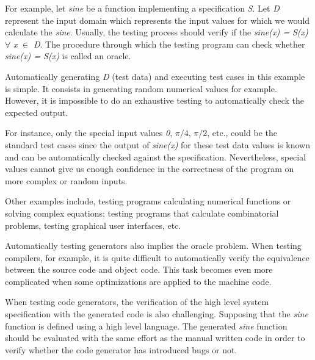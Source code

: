 For example, let \textit{sine} be a function implementing a specification \textit{S}. Let \textit{D} represent the input domain which represents the input values for which we would calculate the \textit{sine}. Usually, the testing process should verify if the \textit{sine(x) = S(x)} $\forall$ \textit{x} $\in$ \textit{D}. The procedure through which the testing program can check whether \textit{sine(x) = S(x)} is called an oracle.

Automatically generating  \textit{D} (test data) and executing test cases in this example is simple. It consists in generating random numerical values for example. However, it is impossible to do an exhaustive testing to automatically check the expected output.

For instance, only the special input values  \textit{0}, $\pi/4$,  $\pi/2$, etc., could be the standard test cases since the output of  \textit{sine(x)} for these test data values is known and can be automatically checked against the specification. Nevertheless, special values cannot give us enough confidence in the correctness of the program on more complex or random inputs. 

Other examples include, testing programs calculating numerical functions or solving complex equations; testing programs that calculate combinatorial problems, testing graphical user interfaces, etc.

Automatically testing generators also implies the oracle problem. When testing compilers, for example, it is quite difficult to automatically verify the equivalence between the source code and object code. This task becomes even more complicated when some optimizations are applied to the machine code. 

When testing code generators, the verification of the high level system specification with the generated code is also challenging. Supposing that the \textit{sine} function is defined using a high level language. The generated \textit{sine} function should be evaluated with the same effort as the manual written code in order to verify whether the code generator has introduced bugs or not. 




